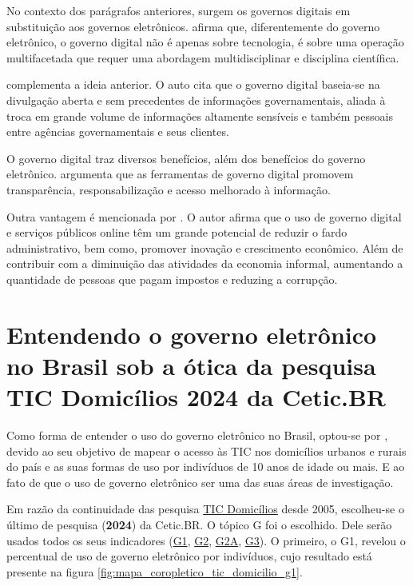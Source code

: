 No contexto dos parágrafos anteriores, surgem os governos digitais em substituição aos governos eletrônicos. \cite{veiga2016digital} afirma que, diferentemente do governo eletrônico, o governo digital não é apenas sobre tecnologia, é sobre uma operação multifacetada  que requer uma abordagem multidisciplinar e disciplina científica. 

\cite{bounabat2017government} complementa a ideia anterior. O auto cita que o governo digital baseia-se na divulgação aberta e sem precedentes de informações governamentais, aliada à troca em grande volume de informações altamente sensíveis e também pessoais entre agências governamentais e seus clientes. 

O governo digital traz diversos benefícios, além dos benefícios do governo eletrônico. \cite{martins2018war} argumenta que as ferramentas de governo digital promovem transparência, responsabilização e acesso melhorado à informação.

Outra vantagem é mencionada por \cite{veiga2016digital}. O autor afirma que o uso de governo digital e serviços públicos online têm um grande potencial de reduzir o fardo administrativo, bem como, promover inovação e crescimento econômico. Além de contribuir com a diminuição das atividades da economia informal, aumentando a quantidade de pessoas que pagam impostos e reduzing a corrupção.

\section{Entendendo o governo eletrônico no Brasil sob a ótica da pesquisa TIC Domicílios 2024 da Cetic.BR}

Como forma de entender o uso do governo eletrônico no Brasil, optou-se por \cite{tic_domicilios_2024}, devido ao seu objetivo de mapear o acesso às TIC nos domicílios urbanos e rurais do país e as suas formas de uso por indivíduos de 10 anos de idade ou mais. E ao fato de que o uso de governo eletrônico ser uma das suas áreas de investigação.

Em razão da continuidade das pesquisa \href{https://cetic.br/pt/pesquisa/domicilios/}{TIC Domicílios} desde 2005, escolheu-se o último de pesquisa (\textbf{2024}) da Cetic.BR. O tópico G foi o escolhido. Dele serão usados todos os seus indicadores (\href{https://cetic.br/pt/tics/domicilios/2024/individuos/G1/}{G1}, \href{https://cetic.br/pt/tics/domicilios/2024/individuos/G2/}{G2}, \href{https://cetic.br/pt/tics/domicilios/2024/individuos/G2A/}{G2A}, \href{https://cetic.br/pt/tics/domicilios/2024/individuos/G3/}{G3}). O primeiro, o G1, revelou o percentual de uso de governo eletrônico por indivíduos, cujo resultado está presente na figura \ref{fig:mapa_coropletico_tic_domicilio_g1}.

